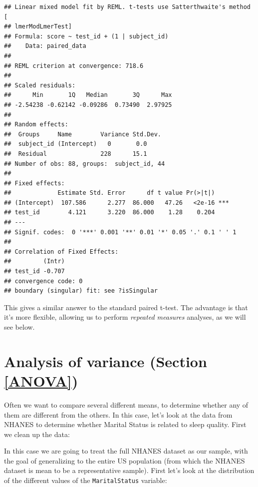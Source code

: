 \documentclass[12pt,]{book}
\newenvironment{Shaded}{\begin{snugshade}}{\end{snugshade}}
\newcommand{\KeywordTok}[1]{\textcolor[rgb]{0.13,0.29,0.53}{\textbf{#1}}}
\newcommand{\NormalTok}[1]{#1}
\newcommand{\OperatorTok}[1]{\textcolor[rgb]{0.81,0.36,0.00}{\textbf{#1}}}
\newcommand{\StringTok}[1]{\textcolor[rgb]{0.31,0.60,0.02}{#1}}
\begin{document}
\begin{verbatim}
## Linear mixed model fit by REML. t-tests use Satterthwaite's method [
## lmerModLmerTest]
## Formula: score ~ test_id + (1 | subject_id)
##    Data: paired_data
## 
## REML criterion at convergence: 718.6
## 
## Scaled residuals: 
##      Min       1Q   Median       3Q      Max 
## -2.54238 -0.62142 -0.09286  0.73490  2.97925 
## 
## Random effects:
##  Groups     Name        Variance Std.Dev.
##  subject_id (Intercept)   0       0.0    
##  Residual               228      15.1    
## Number of obs: 88, groups:  subject_id, 44
## 
## Fixed effects:
##             Estimate Std. Error      df t value Pr(>|t|)    
## (Intercept)  107.586      2.277  86.000   47.26   <2e-16 ***
## test_id        4.121      3.220  86.000    1.28    0.204    
## ---
## Signif. codes:  0 '***' 0.001 '**' 0.01 '*' 0.05 '.' 0.1 ' ' 1
## 
## Correlation of Fixed Effects:
##         (Intr)
## test_id -0.707
## convergence code: 0
## boundary (singular) fit: see ?isSingular
\end{verbatim}

This gives a similar answer to the standard paired t-test. The advantage is that it's more flexible, allowing us to perform \emph{repeated measures} analyses, as we will see below.

\hypertarget{analysis-of-variance-section-refanova}{%
\section{Analysis of variance (Section \ref{ANOVA})}\label{analysis-of-variance-section-refanova}}

Often we want to compare several different means, to determine whether any of them are different from the others. In this case, let's look at the data from NHANES to determine whether Marital Status is related to sleep quality. First we clean up the data:

\begin{Shaded}
\end{Shaded}

In this case we are going to treat the full NHANES dataset as our sample, with the goal of generalizing to the entire US population (from which the NHANES dataset is mean to be a representative sample). First let's look at the distribution of the different values of the \texttt{MaritalStatus} variable:
\end{document}
